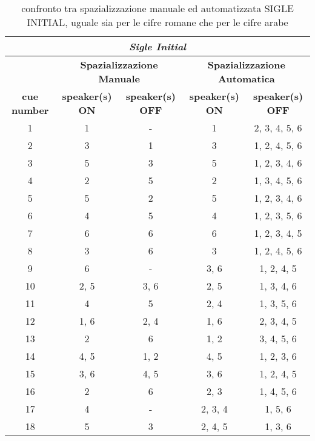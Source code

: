 \begin{table*}[h]

\caption{confronto tra spazializzazione manuale ed automatizzata SIGLE INITIAL, uguale sia per le cifre romane che per le cifre arabe}
\begin{center}
\begin{tabular}{c c c c c}

\hline
\multicolumn{5}{c}{\emph{\textbf{Sigle Initial}}} \\
\hline

	&
\multicolumn{2}{c}{\textbf{Spazializzazione Manuale}} &
\multicolumn{2}{c}{\textbf{Spazializzazione Automatica}} \\

\hline

\textbf{cue number} 	& \textbf{speaker(s) ON}	& \textbf{speaker(s) OFF} 		& \textbf{speaker(s) ON} 		& \textbf{speaker(s) OFF} 		\\
1			&	1			&	-					&	1					&	2, 3, 4, 5, 6 		\\
2			&	3			&	1					&	3					&	1, 2, 4, 5, 6 		\\
3			&	5			&	3					&	5					&	1, 2, 3, 4, 6 		\\
4			&	2			&	5					&	2					&	1, 3, 4, 5, 6 		\\
5			&	5			&	2					&	5					&	1, 2, 3, 4, 6 		\\
6			& 	4			&	5					&	4					&	1, 2, 3, 5, 6 		\\
7			&	6			&	6					&	6					&	1, 2, 3, 4, 5		\\
8			&	3			&	6					&	3					&	1, 2, 4, 5, 6 		\\
9			&	6			&	-					&	3, 6				&	1, 2, 4, 5 			\\
10			&	2, 5		&	3, 6				&	2, 5				&	1, 3, 4, 6 			\\
11			&	4		 	&	5					&	2, 4				&	1, 3, 5, 6 			\\
12			&	1, 6		&	2, 4				&	1, 6				&	2, 3, 4, 5 			\\
13			&	2			&	6					&	1, 2				&	3, 4, 5, 6 			\\
14			&	4, 5		&	1, 2				&	4, 5				&	1, 2, 3, 6 			\\
15			&	3, 6		&	4, 5				&	3, 6				&	1, 2, 4, 5 			\\
16			&	2			&	6					&	2, 3				&	1, 4, 5, 6 			\\
17			&	4			&	-					&	2, 3, 4 			&	1, 5, 6 			\\
18			&	5			&	3					&	2, 4, 5 			&	1, 3, 6 			\\

\end{tabular}
\end{center}
\end{table*}
